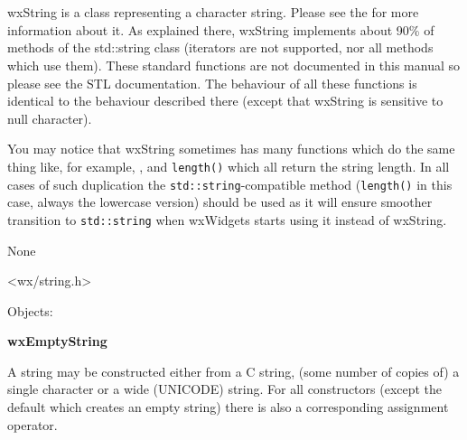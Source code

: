 \section{}\label{wxstring}

wxString is a class representing a character string. Please see the 
 for more information about it. As explained
there, wxString implements about 90\% of methods of the std::string class (iterators
are not supported, nor all methods which use them).
These standard functions are not documented in this manual so please see the STL documentation.
The behaviour of all these functions is identical to the behaviour described
there (except that wxString is sensitive to null character).

You may notice that wxString sometimes has many functions which do the same
thing like, for example, , 
 and {\tt length()} which all return the string
length. In all cases of such duplication the {\tt std::string}-compatible
method ({\tt length()} in this case, always the lowercase version) should be
used as it will ensure smoother transition to {\tt std::string} when wxWidgets
starts using it instead of wxString.


None


<wx/string.h>


Objects:

{\bf wxEmptyString}




\label{constructorsinwxstring}

A string may be constructed either from a C string, (some number of copies of)
a single character or a wide (UNICODE) string. For all constructors (except the
default which creates an empty string) there is also a corresponding assignment
operator.

\\
\\

